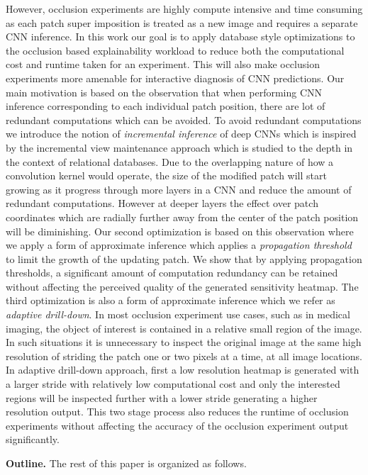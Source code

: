 However, occlusion experiments are highly compute intensive and time consuming as each patch super imposition is treated as a new image and requires a separate CNN inference.
In this work our goal is to apply database style optimizations to the occlusion based explainability workload to reduce both the computational cost and runtime taken for an experiment.
This will also make occlusion experiments more amenable for interactive diagnosis of CNN predictions.
Our main motivation is based on the observation that when performing CNN inference corresponding to each individual patch position, there are lot of redundant computations which can be avoided.
To avoid redundant computations we introduce the notion of \textit{incremental inference} of deep CNNs which is inspired by the incremental view maintenance approach which is studied to the depth in the context of relational databases.
Due to the overlapping nature of how a convolution kernel would operate, the size of the modified patch will start growing as it progress through more layers in a CNN and reduce the amount of redundant computations.
However at deeper layers the effect over patch coordinates which are radially further away from the center of the patch position will be diminishing.
Our second optimization is based on this observation where we apply a form of approximate inference which applies a \textit{propagation threshold} to limit the growth of the updating patch.
We show that by applying propagation thresholds, a significant amount of computation redundancy can be retained without affecting the perceived quality of the generated sensitivity heatmap.
The third optimization is also a form of approximate inference which we refer as \textit{adaptive drill-down}.
In most occlusion experiment use cases, such as in medical imaging, the object of interest is contained in a relative small region of the image.
In such situations it is unnecessary to inspect the original image at the same high resolution of striding the patch one or two pixels at a time, at all image locations.
In adaptive drill-down approach, first a low resolution heatmap is generated with a larger stride with relatively low computational cost and only the interested regions will be inspected further with a lower stride generating a higher resolution output.
This two stage process also reduces the runtime of occlusion experiments without affecting the accuracy of the occlusion experiment output significantly.

\noindent \textbf{Outline.} The rest of this paper is organized as follows.
